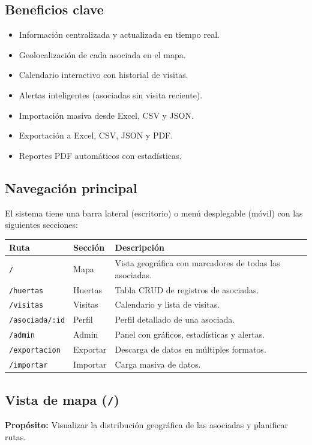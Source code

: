 \documentclass[12pt]{article}
\begin{document}
\subsection{Beneficios clave}
\begin{itemize}[nosep]
  \item Informaci\'on centralizada y actualizada en tiempo real.
  \item Geolocalizaci\'on de cada asociada en el mapa.
  \item Calendario interactivo con historial de visitas.
  \item Alertas inteligentes (asociadas sin visita reciente).
  \item Importaci\'on masiva desde Excel, CSV y JSON.
  \item Exportaci\'on a Excel, CSV, JSON y PDF.
  \item Reportes PDF autom\'aticos con estad\'isticas.
\end{itemize}

\subsection{Navegaci\'on principal}
El sistema tiene una barra lateral (escritorio) o men\'u desplegable (m\'ovil) con las siguientes secciones:

\begin{longtable}{@{}llp{8cm}@{}}
  \toprule
  \textbf{Ruta} & \textbf{Secci\'on} & \textbf{Descripci\'on} \\
  \midrule
  \endhead
  \bottomrule
  \endfoot
  \texttt{/} & Mapa & Vista geogr\'afica con marcadores de todas las asociadas. \\
  \texttt{/huertas} & Huertas & Tabla CRUD de registros de asociadas. \\
  \texttt{/visitas} & Visitas & Calendario y lista de visitas. \\
  \texttt{/asociada/:id} & Perfil & Perfil detallado de una asociada. \\
  \texttt{/admin} & Admin & Panel con gr\'aficos, estad\'isticas y alertas. \\
  \texttt{/exportacion} & Exportar & Descarga de datos en m\'ultiples formatos. \\
  \texttt{/importar} & Importar & Carga masiva de datos. \\
\end{longtable}

\subsection{Vista de mapa (\texttt{/})}
\textbf{Prop\'osito:} Visualizar la distribuci\'on geogr\'afica de las asociadas y planificar rutas.
\end{document}
